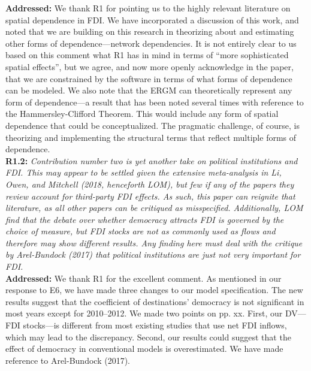 \documentclass[a4paper,11pt]{texMemo}
\begin{document}
\noindent \textbf{Addressed:}  We thank R1 for pointing us to the highly relevant literature on spatial dependence in FDI. We have incorporated a discussion of this work, and noted that we are building on this research in theorizing about and estimating other forms of dependence---network dependencies. It is not entirely clear to us based on this comment what R1 has in mind in terms of ``more sophisticated spatial effects'', but we agree, and now more openly acknowledge in the paper, that we are constrained by the software in terms of what forms of dependence can be modeled. We also note that the ERGM can theoretically represent any form of dependence---a result that has been noted several times with reference to the Hammersley-Clifford Theorem. This would include any form of spatial dependence that could be conceptualized. The pragmatic challenge, of course, is theorizing and implementing the structural terms that reflect multiple forms of dependence.  \\


\noindent \textbf{R1.2:} \emph{Contribution number two is yet another take on political institutions and FDI. This may appear to be settled given the extensive meta-analysis in Li, Owen, and Mitchell (2018, henceforth LOM), but few if any of the papers they review account for third-party FDI effects. As such, this paper can reignite that literature, as all other papers can be critiqued as misspecified. Additionally, LOM find that the debate over whether democracy attracts FDI is governed by the choice of measure, but FDI stocks are not as commonly used as flows and therefore may show different results. Any finding here must deal with the critique by Arel-Bundock (2017) that political institutions are just not very important for FDI.}\\

\noindent \textbf{Addressed:} We thank R1 for the excellent comment. As mentioned in our response to E6, we have made three changes to our model specification. The new results suggest that the coefficient of destinations' democracy is not significant in most years except for 2010--2012. We made two points on pp. xx. First, our DV---FDI stocks---is different from most existing studies that use net FDI inflows, which may lead to the discrepancy. Second, our results could suggest that the effect of democracy in conventional models is overestimated. We have made reference to Arel-Bundock (2017). \\
\end{document}
